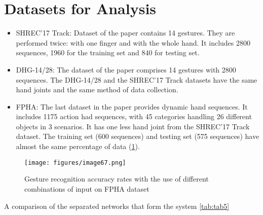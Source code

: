 \documentclass[12pt]{book}
\begin{document}
\section{Datasets for Analysis}
\begin{itemize}
    \item SHREC’17 Track: Dataset of the paper \cite{QUE2017} contains 14 gestures. They are performed twice: with one finger and with the whole hand. It includes 2800 sequences, 1960 for the training set and 840 for testing set. 

    \item DHG-14/28: The dataset of the paper \cite{HAZ2016} comprises 14 gestures with 2800 sequences. The DHG-14/28 and the SHREC’17 Track datasets have the same hand joints and the same method of data collection.  

    \item FPHA: The last dataset in the paper \cite{GUI2018} provides dynamic hand sequences. It includes 1175 action had sequences, with 45 categories handling 26 different objects in 3 scenarios. It has one less hand joint from the SHREC’17 Track dataset. The training set (600 sequences) and testing set (575 sequences) have almost the same percentage of data (\ref{fig:fig35}).
\end{itemize}

\begin{figure}[!htbp]
\centering
  \texttt{[image: figures/image67.png]}
  \\
  \caption{Gesture recognition accuracy rates with the use of  different combinations of input on FPHA dataset \cite{LIU2020}}
  \label{fig:fig35}
\end{figure}

A comparison of the separated networks that form the system \ref{tab:tab5}
\end{document}
